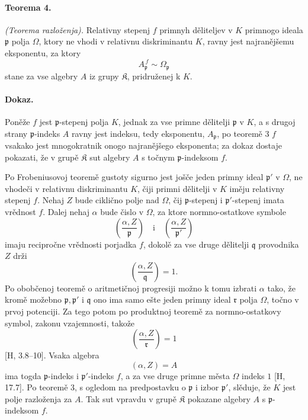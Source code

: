 \documentclass[11pt]{article}
\begin{document}
\paragraph{Teorema 4.}
\emph{(Teorema razloženja).} Relativny stepenj \(f\) primnyh děliteljev v \(K\) primnogo ideala \(\mathfrak p\) polja \(\Omega\), ktory ne vhodi v relativnu diskriminantu \(K\), ravny jest najranějšemu eksponentu, za ktory
\[
        A_{\mathfrak p}^{\,f}\sim\Omega_{\mathfrak p}
\]
stane za vse algebry \(A\) iz grupy \(\mathfrak K\), pridruženej k \(K\).

\paragraph{Dokaz.}
Poněže \(f\) jest \( \mathfrak p\)-stepenj polja \(K\), jednak za vse primne dělitelji \(\mathfrak p\) v \(K\), a s drugoj strany \( \mathfrak p\)-indeks \(A\) ravny jest indeksu, tedy eksponentu, \(A_{\mathfrak p}\), po teoremě 3 \(f\) vsakako jest mnogokratnik onogo najranějšego eksponenta; za dokaz dostaje pokazati, že v grupě \(\mathfrak K\) sut algebry \(A\) s točnym \( \mathfrak p\)-indeksom \(f\).

Po Frobeniusovoj teoremě gustoty sigurno jest jošče jeden primny ideal \(\mathfrak p'\) v \(\Omega\), ne vhodeči v relativnu diskriminantu \(K\), čiji primni dělitelji v \(K\) iměju relativny stepenj \(f\). Nehaj \(Z\) bude ciklično polje nad \(\Omega\), čij \( \mathfrak p\)-stepenj i \( \mathfrak p'\)-stepenj imata vrědnost \(f\). Dalej nehaj \(\alpha\) bude čislo v \(\Omega\), za ktore normno-ostatkove symbole
\[
\left(\frac{\alpha,Z}{\mathfrak p}\right)\quad\text{i}\quad
\left(\frac{\alpha,Z}{\mathfrak p'}\right)
\]
imaju recipročne vrědnosti porjadka \(f\), dokolě za vse druge dělitelji \(\mathfrak q\) provodnika \(Z\) drži
\[
\left(\frac{\alpha,Z}{\mathfrak q}\right)=1.
\]
Po obobčenoj teoremě o aritmetičnoj progresiji možno k tomu izbrati \(\alpha\) tako, že kromě možebno \(\mathfrak p,\mathfrak p'\) i \(\mathfrak q\) ono ima samo ešte jeden primny ideal \(\mathfrak r\) polja \(\Omega\), točno v prvoj potenciji. Za tego potom po produktnoj teoremě za normno-ostatkovy symbol, zakonu vzajemnosti, takože
\[
\left(\frac{\alpha,Z}{\mathfrak r}\right)=1
\]
[H, 3.8--10]. Vsaka algebra
\[
        (\alpha,Z)=A
\]
ima togda \( \mathfrak p\)-indeks i \( \mathfrak p'\)-indeks \(f\), a za vse druge primne města \(\Omega\) indeks \(1\) [H, 17.7]. Po teoremě 3, s ogledom na predpostavku o \(\mathfrak p\) i izbor \(\mathfrak p'\), slěduje, že \(K\) jest polje razloženja za \(A\). Tak sut vpravdu v grupě \(\mathfrak K\) pokazane algebry \(A\) s \( \mathfrak p\)-indeksom \(f\).
\end{document}
